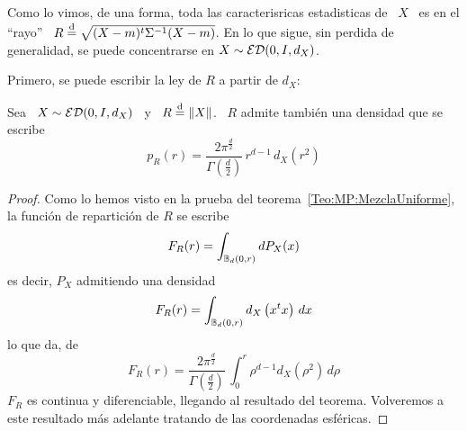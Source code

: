 Como lo vimos, de una forma, toda las caracterisricas estadisticas de \ $X$ \ es
en el  ``rayo'' \ $R \stackrel{\mathrm{d}}{=}  \sqrt{(X-m)^t \Sigma^{-1} (X-m)}$. En  lo que sigue,
sin perdida de generalidad, se puede concentrarse en $X \sim \mathcal{ED}(0,I,d_X)$.

Primero, se puede escribir la ley de $R$ a partir de $d_X$:
%
\begin{teorema}\label{Teo:MP:DensidadRayo}
  Sea \ $X \sim \mathcal{ED}(0,I,d_X)$ \ y \ $R \stackrel{\mathrm{d}}{=} \|X\|$. \ $R$ admite tambi\'en una
  densidad que se escribe
  \[
  p_R(r)  =  \frac{2  \pi^{\frac{d}{2}}}{\Gamma\left(  \frac{d}{2}  \right)}  \,
  r^{d-1} \, d_X\left( r^2 \right)
  \]
\end{teorema}
%
\begin{proof}
  Como lo  hemos visto en la prueba  del teorema~\ref{Teo:MP:MezclaUniforme}, la
  funci\'on de repartici\'on de $R$ se escribe
  \[
  F_R(r) = \int_{\mathbb{B}_d(0,r)} dP_X(x)
  \]
  es decir, $P_X$ admitiendo una densidad
  \[
  F_R(r) = \int_{\mathbb{B}_d(0,r)} d_X\left( x^t x \right) \, dx
  \]
  lo que da, de~\cite[Ec.~4.642]{GraRyz15}
  \[
  F_R(r)  =  \frac{2  \pi^{\frac{d}{2}}}{\Gamma\left(  \frac{d}{2}  \right)}  \,
  \int_0^r \rho^{d-1} d_X\left( \rho^2 \right) \, d\rho
  \]
  $F_R$   es    continua   y   diferenciable,   llegando    al   resultado   del
  teorema.  Volveremos   a  este  resultado  m\'as  adelante   tratando  de  las
  coordenadas esf\'ericas.
\end{proof}


